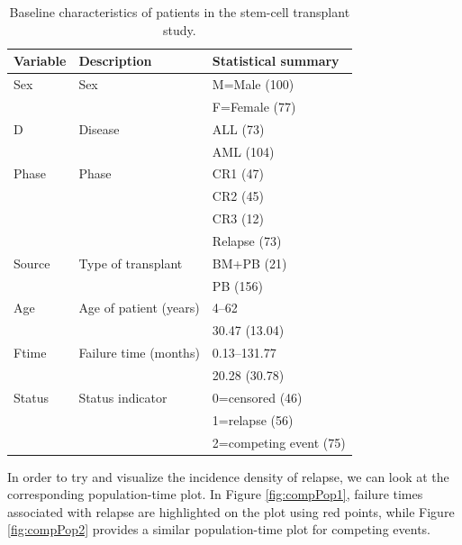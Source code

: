 \documentclass[
]{jss}
\begin{document}
\begin{table}[ht]
\centering
\begin{tabular}{lll}
  \hline
Variable & Description & Statistical summary \\ 
  \hline
Sex & Sex & M=Male (100) \\ 
   &  & F=Female (77) \\ 
  D & Disease & ALL (73) \\ 
   &  & AML (104) \\ 
  Phase & Phase & CR1 (47) \\ 
   &  & CR2 (45) \\ 
   &  & CR3 (12) \\ 
   &  & Relapse (73) \\ 
  Source & Type of transplant & BM+PB (21) \\ 
   &  & PB (156) \\ 
  Age & Age of patient (years) & 4–62 \\ 
   &  & 30.47 (13.04) \\ 
  Ftime & Failure time (months) & 0.13–131.77 \\ 
   &  & 20.28 (30.78) \\ 
  Status & Status indicator & 0=censored (46) \\ 
   &  & 1=relapse (56) \\ 
   &  & 2=competing event (75) \\ 
   \hline
\end{tabular}
\caption{Baseline characteristics of patients in the stem-cell transplant study.}
\label{tab:table1bmtcrr}
\end{table}

In order to try and visualize the incidence density of relapse, we can
look at the corresponding population-time plot. In Figure
\ref{fig:compPop1}, failure times associated with relapse are
highlighted on the plot using red points, while Figure
\ref{fig:compPop2} provides a similar population-time plot for competing
events.
\end{document}
